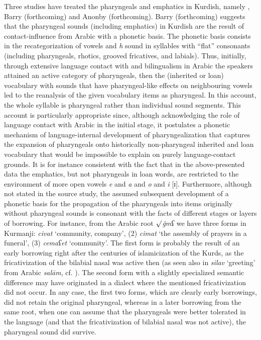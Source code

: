 \documentclass[output=paper]{langsci/langscibook}
\begin{document}
Three studies have treated the pharyngeals and emphatics in Kurdish, namely \citet{Kahn1976}, Barry (forthcoming) and Anonby (forthcoming). Barry (forthcoming) suggests that the pharyngeal sounds (including emphatics) in Kurdish are the result of contact-influence from Arabic with a phonetic basis. The phonetic basis consists in the recategorization of vowels and \textit{h} sound in syllables with “flat” consonants (including pharyngeals, rhotics, grooved fricatives, and labials). Thus, initially, through extensive language contact with and bilingualism in Arabic the speakers attained an active category of pharyngeals, then the (inherited or loan) vocabulary with sounds that have pharyngeal-like effects on neighbouring vowels led to the reanalysis of the given vocabulary items as pharyngeal. In this account, the whole syllable is pharyngeal rather than individual sound segments. This account is particularly appropriate since, although acknowledging the role of language contact with Arabic in the initial stage, it postulates a phonetic mechanism of language-internal development of pharyngealization that captures the expansion of pharyngeals onto historically non-pharyngeal inherited and loan vocabulary that would be impossible to explain on purely language-contact grounds. It is for instance consistent with the fact that in the above-presented data the emphatics, but not pharyngeals in loan words, are restricted to the environment of more open vowels \textit{e} and \textit{a} and \textit{o} and \textit{i} [ɪ]. Furthermore, although not stated in the source study, the assumed subsequent development of a phonetic basis for the propagation of the pharyngeals into items originally without pharyngeal sounds is consonant with the facts of different stages or layers of borrowing. For instance, from the Arabic root ${\surd}$\textit{ǧmʕ} we have three forms in Kurmanji:  \textit{civat} ‘community, company’, (2) \textit{cimat} ‘the assembly of prayers in a funeral’, (3) \textit{cemaʕet} ‘community’. The first form is probably the result of an early borrowing right after the centuries of islamicization of the Kurds, as the fricativization of the bilabial nasal was active then (as seen also in \textit{silav} ‘greeting’ from Arabic \textit{salām}, cf. \citet{Paul2008}). The second form with a slightly specialized semantic difference may have originated in a dialect where the mentioned fricativization did not occur. In any case, the first two forms, which are clearly early borrowings, did not retain the original pharyngeal, whereas in a later borrowing from the same root, when one can assume that the pharyngeals were better tolerated in the language (and that the fricativization of bilabial nasal was not active), the pharyngeal sound did survive.   
\end{document}

